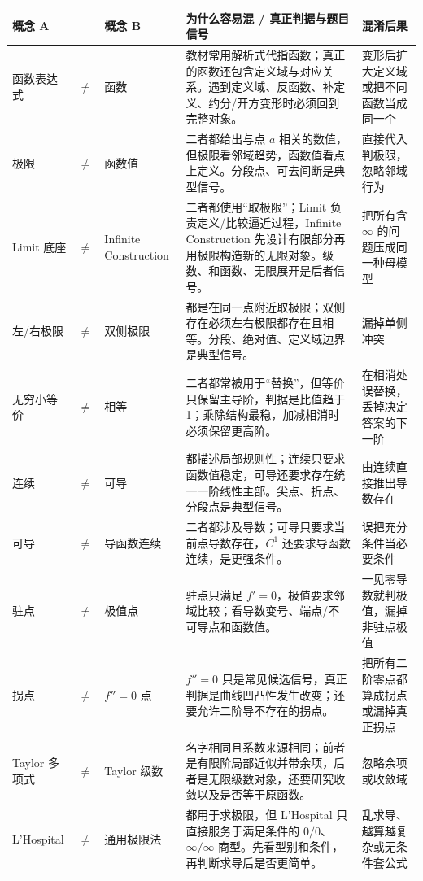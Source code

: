 \documentclass[11pt,a4paper,openany]{ctexbook}
\begin{document}
\begin{longtable}{L{1.8cm}@{}>{\centering\arraybackslash}p{0.35cm}@{}L{1.8cm}L{5.4cm}L{\dimexpr\linewidth-9.72cm\relax}}
\toprule
\textbf{概念 A} & & \textbf{概念 B} & \textbf{为什么容易混 / 真正判据与题目信号} & \textbf{混淆后果}\\
\midrule
函数表达式 & $\neq$ & 函数 & 教材常用解析式代指函数；真正的函数还包含定义域与对应关系。遇到定义域、反函数、补定义、约分/开方变形时必须回到完整对象。 & 变形后扩大定义域或把不同函数当成同一个\\
极限 & $\neq$ & 函数值 & 二者都给出与点 $a$ 相关的数值，但极限看邻域趋势，函数值看点上定义。分段点、可去间断是典型信号。 & 直接代入判极限，忽略邻域行为\\
Limit 底座 & $\neq$ & Infinite Construction & 二者都使用“取极限”；Limit 负责定义/比较逼近过程，Infinite Construction 先设计有限部分再用极限构造新的无限对象。级数、和函数、无限展开是后者信号。 & 把所有含 $\infty$ 的问题压成同一种母模型\\
左/右极限 & $\neq$ & 双侧极限 & 都是在同一点附近取极限；双侧存在必须左右极限都存在且相等。分段、绝对值、定义域边界是典型信号。 & 漏掉单侧冲突\\
无穷小等价 & $\neq$ & 相等 & 二者都常被用于“替换”，但等价只保留主导阶，判据是比值趋于 1；乘除结构最稳，加减相消时必须保留更高阶。 & 在相消处误替换，丢掉决定答案的下一阶\\
连续 & $\neq$ & 可导 & 都描述局部规则性；连续只要求函数值稳定，可导还要求存在统一一阶线性主部。尖点、折点、分段点是典型信号。 & 由连续直接推出导数存在\\
可导 & $\neq$ & 导函数连续 & 二者都涉及导数；可导只要求当前点导数存在，$C^1$ 还要求导函数连续，是更强条件。 & 误把充分条件当必要条件\\
驻点 & $\neq$ & 极值点 & 驻点只满足 $f'=0$，极值要求邻域比较；看导数变号、端点/不可导点和函数值。 & 一见零导数就判极值，漏掉非驻点极值\\
拐点 & $\neq$ & $f''=0$ 点 & $f''=0$ 只是常见候选信号，真正判据是曲线凹凸性发生改变；还要允许二阶导不存在的拐点。 & 把所有二阶零点都算成拐点或漏掉真正拐点\\
Taylor 多项式 & $\neq$ & Taylor 级数 & 名字相同且系数来源相同；前者是有限阶局部近似并带余项，后者是无限级数对象，还要研究收敛以及是否等于原函数。 & 忽略余项或收敛域\\
L'Hospital & $\neq$ & 通用极限法 & 都用于求极限，但 L'Hospital 只直接服务于满足条件的 $0/0$、$\infty/\infty$ 商型。先看型别和条件，再判断求导后是否更简单。 & 乱求导、越算越复杂或无条件套公式\\

\end{longtable}
\end{document}
